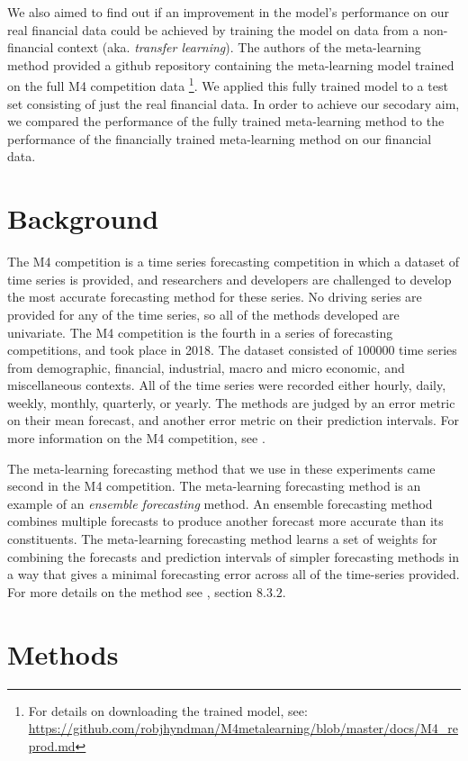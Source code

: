 \documentclass[a4paper,12pt]{article}
\theoremstyle{definition}
\begin{document}
We also aimed to find out if an improvement in the model's performance on our real financial data could be achieved by training the model on data from a non-financial context (aka. \textit{ transfer learning}). The authors of the meta-learning method provided a github repository containing the meta-learning model trained on the full M4 competition data \footnote{For details on downloading the trained model, see: \url{https://github.com/robjhyndman/M4metalearning/blob/master/docs/M4_reprod.md}}. We applied this fully trained model to a test set consisting of just the real financial data. In order to achieve our secodary aim, we compared the performance of the fully trained meta-learning method to the performance of the financially trained meta-learning method on our financial data.

\section{Background}
The M4 competition is a time series forecasting competition in which a dataset of time series is provided, and researchers and developers are challenged to develop the most accurate forecasting method for these series. No driving series are provided for any of the time series, so all of the methods developed are univariate. The M4 competition is the fourth in a series of forecasting competitions, and took place in 2018. The dataset consisted of $100000$ time series from demographic, financial, industrial, macro and micro economic, and miscellaneous contexts. All of the time series were recorded either hourly, daily, weekly, monthly, quarterly, or yearly. The methods are judged by an error metric on their mean forecast, and another error metric on their prediction intervals. For more information on the M4 competition, see \cite{m4}.

The meta-learning forecasting method that we use in these experiments came second in the M4 competition. The meta-learning forecasting method is an example of an \textit{ensemble forecasting} method. An ensemble forecasting method combines multiple forecasts to produce another forecast more accurate than its constituents. The meta-learning forecasting method learns a set of weights for combining the forecasts and prediction intervals of simpler forecasting methods in a way that gives a minimal forecasting error across all of the time-series provided. For more details on the method see \cite{lit}, section $8.3.2$.

\section{Methods}
\end{document}
